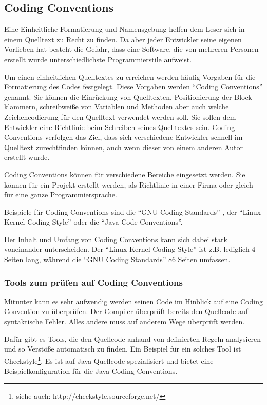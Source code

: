 \subsection{Coding Conventions}

Eine Einheitliche Formatierung und Namensgebung helfen dem Leser sich in einem Quelltext zu Recht zu finden. Da aber jeder Entwickler seine eigenen Vorlieben hat besteht die Gefahr, dass eine Software, die von mehreren Personen erstellt wurde unterschiedlichste Programmierstile aufweist. 

Um einen einheitlichen Quelltextes zu erreichen werden häufig Vorgaben für die Formatierung des Codes festgelegt. Diese Vorgaben werden \enquote{Coding Conventions} genannt. Sie können die Einrückung von Quelltexten,
Positionierung der Block-klammern, schreibweiße von Variablen und Methoden aber auch
welche Zeichencodierung für den Quelltext verwendet werden soll. Sie sollen dem Entwickler eine Richtlinie beim Schreiben seines Quelltextes sein. Coding Conventions verfolgen das Ziel, dass sich verschiedene Entwickler schnell im Quelltext zurechtfinden können, auch wenn dieser von einem anderen Autor erstellt wurde.

Coding Conventions können für verschiedene Bereiche eingesetzt werden. Sie können für
ein Projekt erstellt werden, als Richtlinie in einer Firma oder gleich für eine ganze Programmiersprache.

Beispiele für Coding Conventions sind die \enquote{GNU Coding Standards} \cite{GNUCode},
der \enquote{Linux Kernel Coding Style}\cite{KernelCode} oder die \enquote{Java Code Conventions}\cite{javacode}.

Der Inhalt und Umfang von Coding Conventions kann sich dabei stark voneinander
unterscheiden. Der \enquote{Linux Kernel Coding Style} ist z.B. lediglich 4 Seiten lang,
während die \enquote{GNU Coding Standards} 86 Seiten umfassen.

\subsubsection{Tools zum prüfen auf Coding Conventions}


Mitunter kann es sehr aufwendig werden seinen Code im Hinblick auf eine Coding Convention zu überprüfen. Der Compiler überprüft bereits den Quellcode auf  syntaktische Fehler. Alles andere muss auf anderem Wege überprüft werden.

Dafür gibt es Tools, die den Quellcode anhand von definierten Regeln analysieren
und so Verstöße automatisch zu finden. Ein Beispiel für ein solches Tool ist Checkstyle\footnote{siehe auch: http://checkstyle.sourceforge.net/}.
Es ist auf Java Quellcode spezialisiert und bietet eine Beispielkonfiguration für
die Java Coding Conventions.

